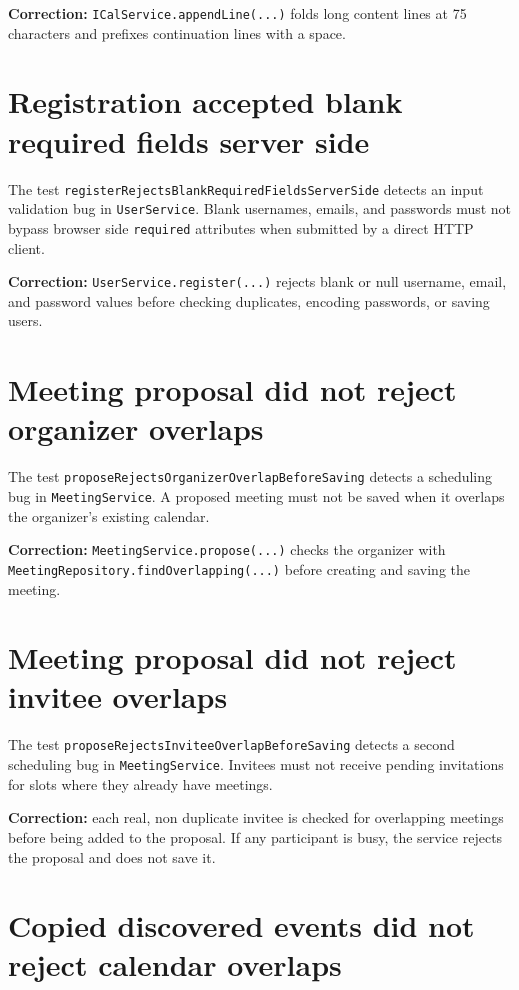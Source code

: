 \textbf{Correction:} \texttt{ICalService.appendLine(...)} folds long content lines at 75 characters and prefixes continuation lines with a space.

\section{Registration accepted blank required fields server side}

The test \texttt{registerRejectsBlankRequiredFieldsServerSide} detects an input validation bug in \texttt{UserService}. Blank usernames, emails, and passwords must not bypass browser side \texttt{required} attributes when submitted by a direct HTTP client.

\textbf{Correction:} \texttt{UserService.register(...)} rejects blank or null username, email, and password values before checking duplicates, encoding passwords, or saving users.

\section{Meeting proposal did not reject organizer overlaps}

The test \texttt{proposeRejectsOrganizerOverlapBeforeSaving} detects a scheduling bug in \texttt{MeetingService}. A proposed meeting must not be saved when it overlaps the organizer's existing calendar.

\textbf{Correction:} \texttt{MeetingService.propose(...)} checks the organizer with \texttt{MeetingRepository.findOverlapping(...)} before creating and saving the meeting.

\section{Meeting proposal did not reject invitee overlaps}

The test \texttt{proposeRejectsInviteeOverlapBeforeSaving} detects a second scheduling bug in \texttt{MeetingService}. Invitees must not receive pending invitations for slots where they already have meetings.

\textbf{Correction:} each real, non duplicate invitee is checked for overlapping meetings before being added to the proposal. If any participant is busy, the service rejects the proposal and does not save it.

\section{Copied discovered events did not reject calendar overlaps}

